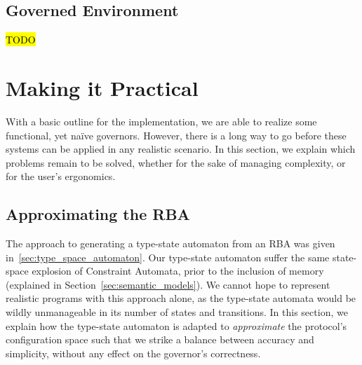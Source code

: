 \subsection{Governed Environment}
\hl{TODO}

\section{Making it Practical}
\label{sec:making_it_practical}
With a basic outline for the implementation, we are able to realize some functional, yet na\"ive governors. However, there is a long way to go before these systems can be applied in any realistic scenario. In this section, we explain which problems remain to be solved, whether for the sake of managing complexity, or for the user's ergonomics.

\subsection{Approximating the RBA}
The approach to generating a type-state automaton from an RBA was given in~\ref{sec:type_space_automaton}. Our type-state automaton suffer the same state-space explosion of Constraint Automata, prior to the inclusion of memory (explained in Section~\ref{sec:semantic_models}). We cannot hope to represent realistic programs with this approach alone, as the type-state automata would be wildly unmanageable in its number of states and transitions. In this section, we explain how the type-state automaton is adapted to \textit{approximate} the protocol's configuration space such that we strike a balance between accuracy and simplicity, without any effect on the governor's correctness.

